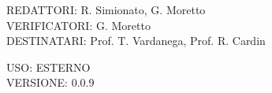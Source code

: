 \documentclass[5pt]{article}
\begin{document}
\vspace{13pt}

\begin{flushleft}
    \begin{spacing}{1.5}
        REDATTORI: R. Simionato, G. Moretto\\%
        VERIFICATORI: G. Moretto\\
        \vspace{7pt}
        DESTINATARI: Prof. T. Vardanega, Prof. R. Cardin\\%
    \end{spacing}
\end{flushleft}

\begin{flushright}
    \begin{spacing}{1}
        USO: ESTERNO\\
        VERSIONE: 0.0.9\\
    \end{spacing}
\end{flushright}


\restoregeometry

\pagebreak
\end{document}
